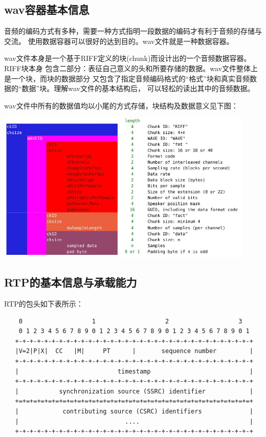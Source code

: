 \documentclass[11pt]{article}
\begin{document}
\subsection{wav容器基本信息}
    音频的编码方式有多种，需要一种方式指明一段数据的编码才有利于音频的存储与交流。
使用数据容器可以很好的达到目的。wav文件就是一种数据容器。
    
    wav文件本身是一个基于RIFF定义的块(chunk)而设计出的一个音频数据容器。RIFF块本身
包含二部分：表征自己意义的头和所要存储的数据。wav文件整体上是一个块，而块的数据部分
又包含了指定音频编码格式的“格式”块和真实音频数据的“数据”块。理解wav文件的基本结构后，
可以轻松的读出其中的音频数据。

    wav文件中所有的数据值均以小尾的方式存储，块结构及数据意义见下图：
\begin{table}[htbp]
    \includegraphics[width = 350pt]{wav_chunk.jpg}
\end{table}



\subsection{RTP的基本信息与承载能力}
    RTP的包头如下表所示：
{  \small
\begin{verbatim}
    0                   1                   2                   3
    0 1 2 3 4 5 6 7 8 9 0 1 2 3 4 5 6 7 8 9 0 1 2 3 4 5 6 7 8 9 0 1
   +-+-+-+-+-+-+-+-+-+-+-+-+-+-+-+-+-+-+-+-+-+-+-+-+-+-+-+-+-+-+-+-+
   |V=2|P|X|  CC   |M|     PT      |       sequence number         |
   +-+-+-+-+-+-+-+-+-+-+-+-+-+-+-+-+-+-+-+-+-+-+-+-+-+-+-+-+-+-+-+-+
   |                           timestamp                           |
   +-+-+-+-+-+-+-+-+-+-+-+-+-+-+-+-+-+-+-+-+-+-+-+-+-+-+-+-+-+-+-+-+
   |           synchronization source (SSRC) identifier            |
   +=+=+=+=+=+=+=+=+=+=+=+=+=+=+=+=+=+=+=+=+=+=+=+=+=+=+=+=+=+=+=+=+
   |            contributing source (CSRC) identifiers             |
   |                             ....                              |
   +-+-+-+-+-+-+-+-+-+-+-+-+-+-+-+-+-+-+-+-+-+-+-+-+-+-+-+-+-+-+-+-+

\end{verbatim}
}
\end{document}

